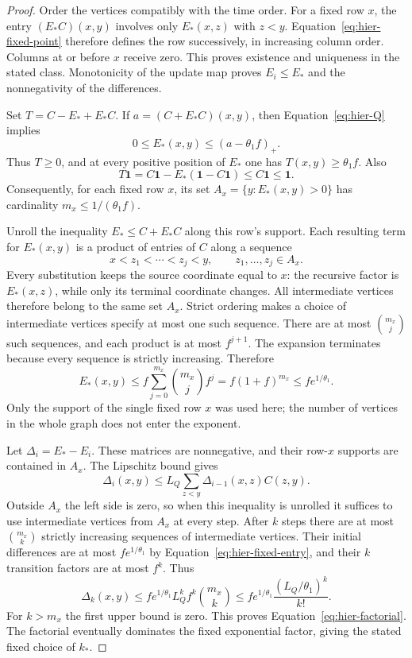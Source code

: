 \begin{proof}
Order the vertices compatibly with the time order.  For a
fixed row $x$, the entry $(E_*C)(x,y)$ involves only $E_*(x,z)$ with
$z<y$.  Equation~\eqref{eq:hier-fixed-point} therefore defines the row
successively, in increasing column order.  Columns at or before $x$
receive zero.  This proves existence and uniqueness in the stated class.  Monotonicity of the update map proves
$E_i\leq E_*$ and the nonnegativity of the differences.

Set $T=C-E_*+E_*C$.  If $a=(C+E_*C)(x,y)$, then
Equation~\eqref{eq:hier-Q} implies
\[
 0\leq E_*(x,y)\leq(a-\theta_1f)_+.
\]
Thus $T\geq0$, and at every positive position of $E_*$ one has
$T(x,y)\geq\theta_1f$.  Also
\begin{equation}
 T\mathbf 1=C\mathbf 1-E_*(\mathbf 1-C\mathbf 1)
       \leq C\mathbf 1\leq\mathbf 1.
 \label{eq:hier-fixed-residual-mass}
\end{equation}
Consequently, for each fixed row $x$, its set
$A_x=\{y:E_*(x,y)>0\}$ has cardinality
$m_x\leq1/(\theta_1f)$.

Unroll the inequality $E_*\leq C+E_*C$ along this row's support.
Each resulting term for $E_*(x,y)$ is a product of entries of $C$
along a sequence
\[
 x<z_1<\cdots<z_j<y,
 \qquad z_1,\ldots,z_j\in A_x.
\]
Every substitution keeps the source coordinate equal to $x$: the
recursive factor is $E_*(x,z)$, while only its terminal coordinate
changes.  All intermediate vertices therefore belong to the same set
$A_x$.  Strict ordering makes a choice of intermediate vertices specify
at most one such sequence.
There are at most $\binom{m_x}{j}$ such sequences, and each product
is at most $f^{j+1}$.  The expansion terminates because every sequence
is strictly increasing.  Therefore
\begin{equation}
 E_*(x,y)\leq
 f\sum_{j=0}^{m_x}\binom{m_x}{j}f^j
 =f(1+f)^{m_x}\leq fe^{1/\theta_1}.
 \label{eq:hier-fixed-entry}
\end{equation}
Only the support of the single fixed row $x$ was used here; the number
of vertices in the whole graph does not enter the exponent.

Let $\Delta_i=E_*-E_i$.  These matrices are nonnegative, and their
row-$x$ supports are contained in $A_x$.  The Lipschitz bound gives
\[
 \Delta_i(x,y)\leq
 L_Q\sum_{z<y}\Delta_{i-1}(x,z)C(z,y).
\]
Outside $A_x$ the left side is zero, so when this inequality is unrolled
it suffices to use intermediate vertices from $A_x$ at every step.
After $k$ steps there are at most $\binom{m_x}{k}$ strictly increasing
sequences of intermediate vertices.  Their initial differences are at
most $fe^{1/\theta_1}$ by Equation~\eqref{eq:hier-fixed-entry}, and
their $k$ transition factors are at most $f^k$.  Thus
\[
 \Delta_k(x,y)
 \leq fe^{1/\theta_1}L_Q^kf^k\binom{m_x}{k}
 \leq fe^{1/\theta_1}\frac{(L_Q/\theta_1)^k}{k!}.
\]
For $k>m_x$ the first upper bound is zero.  This proves
Equation~\eqref{eq:hier-factorial}.  The factorial eventually dominates
the fixed exponential factor, giving the stated fixed choice of $k_*$.
\end{proof}

